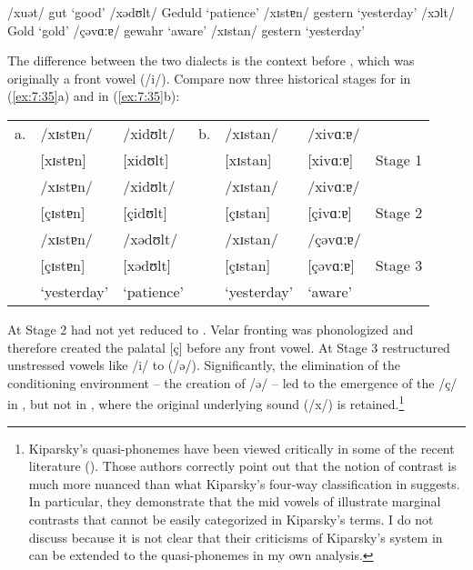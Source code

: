 \ea\label{ex:7:33}
\ea\label{ex:7:33a}\relax [xuət] \tab /xuət/ \tab gut \tab ‘good’
\ex\label{ex:7:33b}\relax [xədʊlt] \tab /xədʊlt/ \tab Geduld \tab ‘patience’
\ex\label{ex:7:33c}\relax [çɪstɐn] \tab /xɪstɐn/ \tab gestern \tab ‘yesterday’
\z 
\ex\label{ex:7:34}
\ea\label{ex:7:34a}\relax [xɔlt] \tab /xɔlt/ \tab Gold \tab ‘gold’
\ex\label{ex:7:34b}\relax [çəvɑːɐ] \tab /çəvɑːɐ/ \tab gewahr \tab ‘aware’
\ex\label{ex:7:34c}\relax [çɪstan] \tab /xɪstan/ \tab gestern \tab ‘yesterday’
\z 
\z 

The difference between the two dialects is the context before , which was originally a front vowel (/i/). Compare now three historical stages for  in (\ref{ex:7:35}a) and  in (\ref{ex:7:35}b):

\ea%
    \label{ex:7:35}
\begin{tabular}[t]{@{} *{7}{l} @{}}
a.&   /xɪstɐn/  &    /xidʊlt/  & b. & /xɪstan/       &  /xivɑːɐ/  &        \\
  &   [xɪstɐn]  &  [xidʊlt]    &    &  [xɪstan]      &[xivɑːɐ]    & Stage 1\\\tablevspace
  &   /xɪstɐn/  &    /xidʊlt/  &    &  /xɪstan/      &   /xivɑːɐ/ &        \\
  &   [çɪstɐn]  &  [çidʊlt]    &    &  [çɪstan]      &[çivɑːɐ]    & Stage 2\\\tablevspace
  &   /xɪstɐn/  &    /xədʊlt/  &    &  /xɪstan/      &   /çəvɑːɐ/ &        \\
  &  [çɪstɐn]   & [xədʊlt]     &    &  [çɪstan]      &[çəvɑːɐ]    & Stage 3\\
  & ‘yesterday’ &   ‘patience’ &    &    ‘yesterday’ &  ‘aware’   &        \\
\end{tabular}
\z 

At Stage 2  had not yet reduced  to . Velar fronting was phonologized and therefore created the palatal [ç] before any front vowel. At Stage 3  restructured unstressed vowels like /i/ to  (/ə/). Significantly, the elimination of the conditioning environment -- the creation of /ə/ -- led to the emergence of the  /ç/ in , but not in , where the original underlying sound (/x/) is retained.\footnote{{Kiparsky's quasi-phonemes have been viewed critically in some of the recent literature (\citealt{RenwickLadd2016}). Those authors correctly point out that the notion of contrast is much more nuanced than what Kiparsky’s four-way classification in  suggests. In particular, they demonstrate that the mid vowels of  illustrate marginal contrasts that cannot be easily categorized in Kiparsky's terms. I do not discuss \citet{RenwickLadd2016} because it is not clear that their criticisms of Kiparsky's system in  can be extended to the quasi-phonemes in my own analysis.}}


